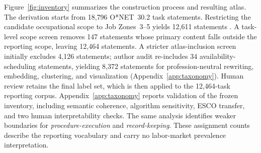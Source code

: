\documentclass[10pt]{article}
\begin{document}
Figure~\ref{fig:inventory} summarizes the construction process and resulting atlas. The derivation starts from 18{,}796 O{*}NET~30.2 task statements. Restricting the candidate occupational scope to Job Zones~3--5 yields 12{,}611 statements \citep{onet2024tasks}. A task-level scope screen removes 147 statements whose primary content falls outside the reporting scope, leaving 12{,}464 statements. A stricter atlas-inclusion screen initially excludes 4{,}126 statements; author audit re-includes 34 availability-scheduling statements, yielding 8{,}372 statements for profession-neutral rewriting, embedding, clustering, and visualization (Appendix~\ref{app:taxonomy}). Human review retains the final label set, which is then applied to the 12{,}464-task reporting corpus. Appendix~\ref{app:taxonomy} reports validation of the frozen inventory, including semantic coherence, algorithm sensitivity, ESCO transfer, and two human interpretability checks. The same analysis identifies weaker boundaries for \emph{procedure-execution} and \emph{record-keeping}. These assignment counts describe the reporting vocabulary and carry no labor-market prevalence interpretation.
\end{document}
